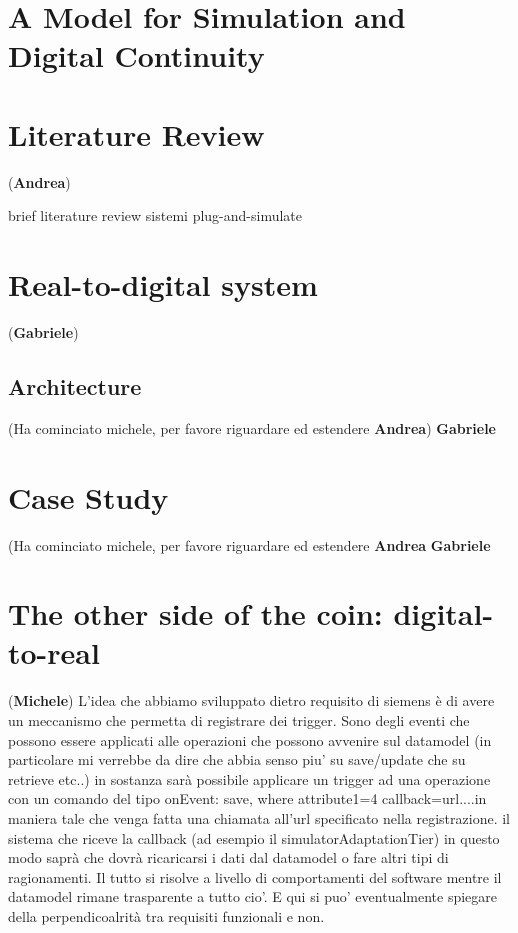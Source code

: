 \documentclass{riverk}
\begin{document}
\section{A Model for Simulation and Digital Continuity}\label{sec:model}


\section{Literature Review}
(\textbf{Andrea})

brief literature review sistemi plug-and-simulate


\section{Real-to-digital system}
(\textbf{Gabriele})


\subsection{Architecture}
(Ha cominciato michele, per favore riguardare ed estendere \textbf{Andrea}) \textbf{Gabriele}




\section{Case Study}
(Ha cominciato michele, per favore riguardare ed estendere \textbf{Andrea} \textbf{Gabriele}


\section{The other side of the coin: digital-to-real}
(\textbf{Michele})
L'idea che abbiamo sviluppato dietro requisito di siemens è di avere un meccanismo che permetta di registrare 
dei trigger. Sono degli eventi che possono essere applicati alle operazioni che possono avvenire sul datamodel (in particolare mi verrebbe da dire che abbia senso piu' su save/update che su retrieve etc..) in sostanza sarà possibile applicare un trigger ad una operazione con un comando del tipo  onEvent: save, where attribute1=4 callback=url....in maniera tale che venga fatta una chiamata all'url specificato nella registrazione. il sistema che riceve la callback (ad esempio il simulatorAdaptationTier) in questo modo saprà che dovrà ricaricarsi i dati dal datamodel o fare altri tipi di ragionamenti. 
Il tutto si risolve a livello di comportamenti del software mentre il datamodel rimane trasparente a tutto cio'. E qui si puo' eventualmente spiegare della perpendicoalrità tra requisiti funzionali e non.
\end{document}
